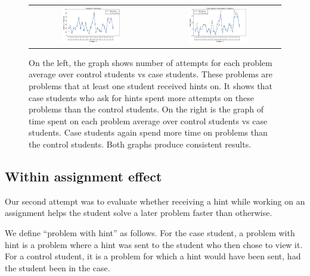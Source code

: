 \documentclass{llncs2e/llncs}
\begin{document}
\fi
\begin{figure}[ht]
\centering
   \begin{tabular}{c c}
		\includegraphics[width=0.5\textwidth]{image/new_tries_analysis.png} &
		\includegraphics[width=0.5\textwidth]{image/new_times_analysis.png}
	\end{tabular}
\caption{On the left, the graph shows number of attempts for each problem average over control students vs case students. These problems are problems that at least one student received hints on. It shows that case students who ask for hints spent more attempts on these problems than the control students. On the right is the graph of time spent on each problem average over control students vs case students. Case students again spend more time on problems than the control students. Both graphs produce consistent results.}
    \label{fig:tries_times_analysis}
\end{figure}

\subsection{Within assignment effect}

Our second attempt was to evaluate whether receiving a hint while
working on an assignment helps the student solve a later problem faster
than otherwise.

We define ``problem with hint'' as follows. For the case student, a
problem with hint is a problem where a hint was sent to the student
who then chose to view it. For a control student, it is a problem for
which a hint would have been sent, had the student been in the case.
\end{document}
